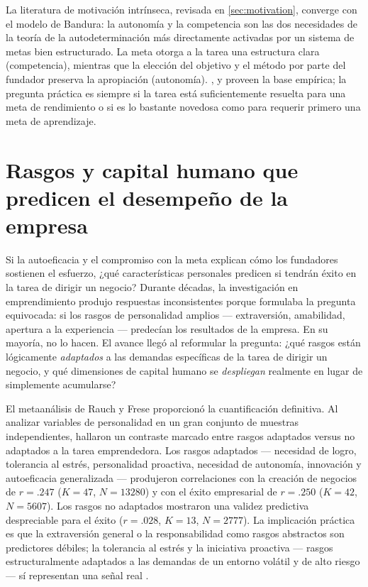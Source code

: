 La literatura de motivación intrínseca, revisada en \cref{sec:motivation}, converge con el
modelo de Bandura: la autonomía y la competencia son las dos necesidades de la teoría de la
autodeterminación más directamente activadas por un sistema de metas bien estructurado. La meta
otorga a la tarea una estructura clara (competencia), mientras que la elección del objetivo y
el método por parte del fundador preserva la apropiación (autonomía). \textcite{bandura1997self},
\textcite{stajkovic1998self} y \textcite{locke2002building} proveen la base empírica; la
pregunta práctica es siempre si la tarea está suficientemente resuelta para una meta de
rendimiento o si es lo bastante novedosa como para requerir primero una meta de aprendizaje.

\section{Rasgos y capital humano que predicen el desempeño de la empresa}\label{sec:traits-human-capital}

Si la autoeficacia y el compromiso con la meta explican cómo los fundadores sostienen el
esfuerzo, ¿qué características personales predicen si tendrán éxito en la tarea de dirigir un
negocio? Durante décadas, la investigación en emprendimiento produjo respuestas inconsistentes
porque formulaba la pregunta equivocada: si los rasgos de personalidad amplios --- extraversión,
amabilidad, apertura a la experiencia --- predecían los resultados de la empresa. En su mayoría,
no lo hacen. El avance llegó al reformular la pregunta: ¿qué rasgos están lógicamente
\emph{adaptados} a las demandas específicas de la tarea de dirigir un negocio, y qué dimensiones
de capital humano se \emph{despliegan} realmente en lugar de simplemente acumularse?

El metaanálisis de Rauch y Frese proporcionó la cuantificación definitiva. Al analizar variables
de personalidad en un gran conjunto de muestras independientes, hallaron un contraste marcado
entre rasgos adaptados versus no adaptados a la tarea emprendedora. Los rasgos adaptados ---
necesidad de logro, tolerancia al estrés, personalidad proactiva, necesidad de autonomía,
innovación y autoeficacia generalizada --- produjeron correlaciones con la creación de negocios
de $r = .247$ ($K = 47$, $N = \num{13280}$) y con el éxito empresarial de $r = .250$
($K = 42$, $N = \num{5607}$). Los rasgos no adaptados mostraron una validez predictiva
despreciable para el éxito ($r = .028$, $K = 13$, $N = \num{2777}$). %
La implicación práctica es que la extraversión general o la responsabilidad como rasgos
abstractos son predictores débiles; la tolerancia al estrés y la iniciativa proactiva --- rasgos
estructuralmente adaptados a las demandas de un entorno volátil y de alto riesgo --- sí
representan una señal real \parencite{rauch2007person}.

